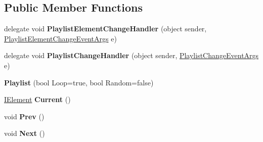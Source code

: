 \subsection*{Public Member Functions}
\begin{DoxyCompactItemize}
\item 
\hypertarget{class_media_motion_1_1_modules_1_1_components_1_1_playlist_1_1_playlist_afe2c90bf65e6c602134d6855eb719046}{delegate void {\bfseries Playlist\+Element\+Change\+Handler} (object sender, \hyperlink{class_media_motion_1_1_modules_1_1_components_1_1_playlist_1_1_events_1_1_playlist_element_change_event_args}{Playlist\+Element\+Change\+Event\+Args} e)}\label{class_media_motion_1_1_modules_1_1_components_1_1_playlist_1_1_playlist_afe2c90bf65e6c602134d6855eb719046}

\item 
\hypertarget{class_media_motion_1_1_modules_1_1_components_1_1_playlist_1_1_playlist_a4d6d093a372a5e0909aecbf339d013f6}{delegate void {\bfseries Playlist\+Change\+Handler} (object sender, \hyperlink{class_media_motion_1_1_modules_1_1_components_1_1_playlist_1_1_events_1_1_playlist_change_event_args}{Playlist\+Change\+Event\+Args} e)}\label{class_media_motion_1_1_modules_1_1_components_1_1_playlist_1_1_playlist_a4d6d093a372a5e0909aecbf339d013f6}

\item 
\hypertarget{class_media_motion_1_1_modules_1_1_components_1_1_playlist_1_1_playlist_aaa0f71cc951631f2f05c287cffe9d64b}{{\bfseries Playlist} (bool Loop=true, bool Random=false)}\label{class_media_motion_1_1_modules_1_1_components_1_1_playlist_1_1_playlist_aaa0f71cc951631f2f05c287cffe9d64b}

\item 
\hypertarget{class_media_motion_1_1_modules_1_1_components_1_1_playlist_1_1_playlist_ad180bca0034027f3776f71dc3acaa3a2}{\hyperlink{interface_media_motion_1_1_core_1_1_models_1_1_interfaces_1_1_i_element}{I\+Element} {\bfseries Current} ()}\label{class_media_motion_1_1_modules_1_1_components_1_1_playlist_1_1_playlist_ad180bca0034027f3776f71dc3acaa3a2}

\item 
\hypertarget{class_media_motion_1_1_modules_1_1_components_1_1_playlist_1_1_playlist_a27629b345ac08920422898c79aca3d79}{void {\bfseries Prev} ()}\label{class_media_motion_1_1_modules_1_1_components_1_1_playlist_1_1_playlist_a27629b345ac08920422898c79aca3d79}

\item 
\hypertarget{class_media_motion_1_1_modules_1_1_components_1_1_playlist_1_1_playlist_a7f684e4fc067e47b7041127c7f8ea5fc}{void {\bfseries Next} ()}\label{class_media_motion_1_1_modules_1_1_components_1_1_playlist_1_1_playlist_a7f684e4fc067e47b7041127c7f8ea5fc}


\end{DoxyCompactItemize}
